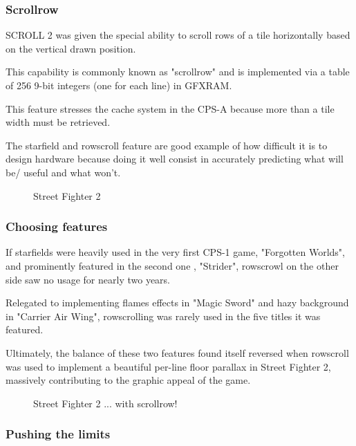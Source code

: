 \subsubsection{Scrollrow}
SCROLL 2 was given the special ability to scroll rows of a tile horizontally based on the vertical drawn position. 

This capability is commonly known as "scrollrow" and is implemented via a table of 256 9-bit integers (one for each line) in GFXRAM.

This feature stresses the cache system in the CPS-A because more than a tile width must be retrieved.

The starfield and rowscroll feature are good example of how difficult it is to design hardware because doing it well consist in accurately predicting what will be/ useful and what won't. 

\vfill
\begin{figure}[!b]
 \caption*{Street Fighter 2}%
 \end{figure}%
\pagebreak


\subsubsection{Choosing features}


If starfields were heavily used in the very first CPS-1 game, "Forgotten Worlds", and prominently featured in the second one , "Strider", rowscrowl on the other side saw no usage for nearly two years. 

Relegated to implementing flames effects in "Magic Sword" and hazy background in "Carrier Air Wing", rowscrolling was rarely used in the five titles\cite{mame_cps1_video} it was featured.

Ultimately, the balance of these two features found itself reversed when rowscroll was used to implement a beautiful per-line floor parallax in Street Fighter 2, massively contributing to the graphic appeal of the game.


\vfill
\begin{figure}[!b]
 \caption*{Street Fighter 2 ... with scrollrow!}%
 \end{figure}%
\pagebreak







\subsubsection{Pushing the limits}

